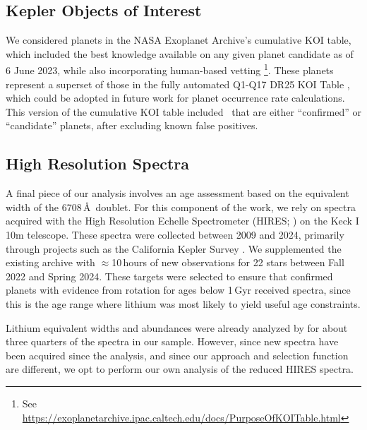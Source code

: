\documentclass[11pt,twocolumn,tighten]{aastex63}
\newcommand{\nkoiswithprot}{{$\sim$2{,}000}}
\newcommand{\nkoisnofpwithprot}{{$\sim$1{,}000}}
\begin{document}
\subsection{Kepler Objects of Interest}
\label{subsec:planetsel}

We considered planets in the NASA Exoplanet Archive's cumulative KOI
table, which included the best knowledge available on any given planet
candidate as of 6 June 2023, while also incorporating human-based
vetting \footnote{See
\url{https://exoplanetarchive.ipac.caltech.edu/docs/PurposeOfKOITable.html}}.
These planets represent a superset of those in the fully automated
Q1-Q17 DR25 KOI Table \citep{Thompson_2018}, which could be adopted in
future work for planet occurrence rate calculations.  This version of
the cumulative KOI table included \nkoisnofp\ that are either
``confirmed'' or ``candidate'' planets, after excluding known false
positives. 


\subsection{High Resolution Spectra}
A final piece of our analysis involves an age assessment based on the
equivalent width of the  6708\,\AA\ doublet.  For this
component of the work, we rely on spectra acquired with the High
Resolution Echelle Spectrometer (HIRES; \citealt{vogt_hires_1994}) on
the Keck I 10m telescope.  These spectra were collected between 2009
and 2024, primarily through projects such as the California Kepler
Survey
\citep{2017AJ....154..107P,2017AJ....154..108J,2017AJ....154..109F}.
We supplemented the existing archive with $\approx$10\,hours of new
observations for 22 stars between Fall 2022 and Spring 2024.
These targets were selected to ensure that confirmed planets with
evidence from rotation for ages below 1\,Gyr received spectra, since
this is the age range where lithium was most likely to yield
useful age constraints.

Lithium equivalent widths and abundances were already analyzed by
\citet{2018ApJ...855..115B} for about three quarters of the spectra in
our sample.
However, since new spectra have been acquired since the
\citeauthor{2018ApJ...855..115B} analysis, and since our approach and
selection function are different, we opt to perform our own analysis
of the reduced HIRES spectra.
\end{document}
